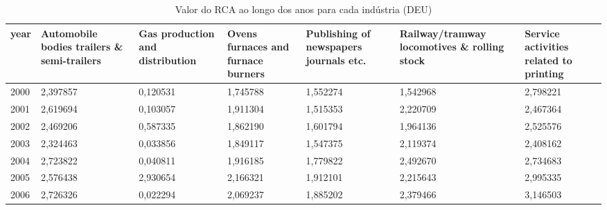 \begin{table}
\centering
\caption{Valor do RCA ao longo dos anos para cada indústria (DEU)}
\begin{tabular}{p{1cm}p{2cm}p{2cm}p{2cm}p{2cm}p{2cm}p{2cm}}
\toprule
 year &  Automobile bodies trailers \& semi-trailers &  Gas production and distribution &  Ovens furnaces and furnace burners &  Publishing of newspapers journals etc. &  Railway/tramway locomotives \& rolling stock &  Service activities related to printing \\
\midrule
 2000 &                                    2,397857 &                         0,120531 &                            1,745788 &                                1,552274 &                                     1,542968 &                                2,798221 \\
 2001 &                                    2,619694 &                         0,103057 &                            1,911304 &                                1,515353 &                                     2,220709 &                                2,467364 \\
 2002 &                                    2,469206 &                         0,587335 &                            1,862190 &                                1,601794 &                                     1,964136 &                                2,525576 \\
 2003 &                                    2,324463 &                         0,033856 &                            1,849117 &                                1,547375 &                                     2,119374 &                                2,408162 \\
 2004 &                                    2,723822 &                         0,040811 &                            1,916185 &                                1,779822 &                                     2,492670 &                                2,734683 \\
 2005 &                                    2,576438 &                         2,930654 &                            2,166321 &                                1,912101 &                                     2,215643 &                                2,995335 \\
 2006 &                                    2,726326 &                         0,022294 &                            2,069237 &                                1,885202 &                                     2,379466 &                                3,146503 \\

\end{tabular}
\end{table}

